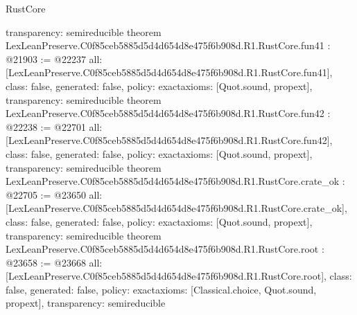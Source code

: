 \begin{lexlean}{RustCore}
\begin{coremodule}
{  transparency: semireducible
}
theorem LexLeanPreserve.C0f85ceb5885d5d4d654d8e475f6b908d.R1.RustCore.fun41 : @21903 := @22237 {
  all: [LexLeanPreserve.C0f85ceb5885d5d4d654d8e475f6b908d.R1.RustCore.fun41],
  class: false,
  generated: false,
  policy: exact{axioms: [Quot.sound, propext]},
  transparency: semireducible
}
theorem LexLeanPreserve.C0f85ceb5885d5d4d654d8e475f6b908d.R1.RustCore.fun42 : @22238 := @22701 {
  all: [LexLeanPreserve.C0f85ceb5885d5d4d654d8e475f6b908d.R1.RustCore.fun42],
  class: false,
  generated: false,
  policy: exact{axioms: [Quot.sound, propext]},
  transparency: semireducible
}
theorem LexLeanPreserve.C0f85ceb5885d5d4d654d8e475f6b908d.R1.RustCore.crate_ok : @22705 := @23650 {
  all: [LexLeanPreserve.C0f85ceb5885d5d4d654d8e475f6b908d.R1.RustCore.crate_ok],
  class: false,
  generated: false,
  policy: exact{axioms: [Quot.sound, propext]},
  transparency: semireducible
}
theorem LexLeanPreserve.C0f85ceb5885d5d4d654d8e475f6b908d.R1.RustCore.root : @23658 := @23668 {
  all: [LexLeanPreserve.C0f85ceb5885d5d4d654d8e475f6b908d.R1.RustCore.root],
  class: false,
  generated: false,
  policy: exact{axioms: [Classical.choice, Quot.sound, propext]},
  transparency: semireducible
}


\end{coremodule}
\end{lexlean}

